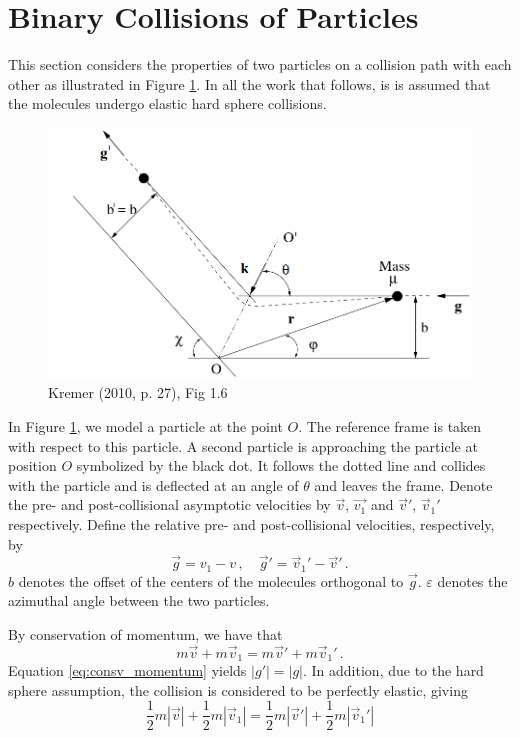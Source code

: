 \documentclass[12pt]{CSUNthesis}
\newcommand{\vecv}{\vec{v}}
\begin{document}
\section{Binary Collisions of Particles}
\label{sec:bincol}
	This section considers the properties of two particles on a collision path with each other as illustrated in Figure \ref{fig:binary_collision}. In all the work that follows, is is assumed that the molecules undergo elastic hard sphere collisions. 
\begin{figure}[h]
	\centering
	\includegraphics[scale=.5]{binary_collision}
	\caption{Kremer (2010, p. 27), Fig 1.6}
	\label{fig:binary_collision}
\end{figure}
	In Figure \ref{fig:binary_collision}, we model a particle at the point $O$. The reference frame is taken with respect to this particle. A second particle is approaching the particle at position $O$ symbolized by the black dot. It follows the dotted line and collides with the particle and is deflected at an angle of $\theta$ and leaves the frame.
	 Denote the pre- and post-collisional asymptotic velocities by $\vec{v}$, $\vec{v_1}$ and $\vec{v}'$, $\vec{v}_1'$ respectively. Define the relative pre- and post-collisional velocities, respectively, by 
\begin{equation*}
	\vec{g} = v_1 - v\, , \quad \vec{g}' = \vec{v}_1'-\vec{v}' \, .
\end{equation*}
$b$ denotes the offset of the centers of the molecules orthogonal to $\vec{g}$. $\varepsilon$ denotes the azimuthal angle between the two particles. 

By conservation of momentum, we have that 
\begin{equation}
\label{eq:consv_momentum}
m \vecv + m \vecv_1 = m\vecv' + m\vecv_1'\, .
\end{equation}
Equation \ref{eq:consv_momentum} yields $|g'| = |g|$. In addition, due to the hard sphere assumption, the collision is considered to be perfectly elastic, giving
\begin{equation}
\label{eq:consv_kin}
\frac{1}{2} m|\vecv| + \frac{1}{2} m|\vecv_1| = \frac{1}{2}m|\vecv'| + \frac{1}{2}m|\vecv_1'|
\end{equation}
\end{document}
